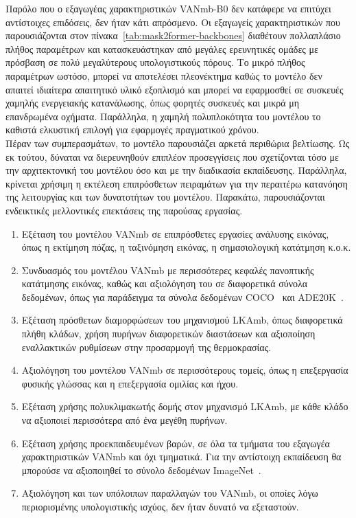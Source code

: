 \documentclass[12pt]{article}
\numberwithin{equation}{section}
\begin{document}
Παρόλο που ο εξαγωγέας χαρακτηριστικών VANmb-B0 δεν κατάφερε να επιτύχει αντίστοιχες επιδόσεις, δεν ήταν κάτι απρόσμενο. Οι εξαγωγείς χαρακτηριστικών που παρουσιάζονται στον πίνακα~\ref{tab:mask2former-backbones} διαθέτουν πολλαπλάσιο πλήθος παραμέτρων και κατασκευάστηκαν από μεγάλες ερευνητικές ομάδες με πρόσβαση σε πολύ μεγαλύτερους υπολογιστικούς πόρους. Το μικρό πλήθος παραμέτρων ωστόσο, μπορεί να αποτελέσει πλεονέκτημα καθώς το μοντέλο δεν απαιτεί ιδιαίτερα απαιτητικό υλικό εξοπλισμό και μπορεί να εφαρμοσθεί σε συσκευές χαμηλής ενεργειακής κατανάλωσης, όπως φορητές συσκευές και μικρά μη επανδρωμένα οχήματα. Παράλληλα, η χαμηλή πολυπλοκότητα του μοντέλου το καθιστά ελκυστική επιλογή για εφαρμογές πραγματικού χρόνου.\\

Πέραν των συμπερασμάτων, το μοντέλο παρουσιάζει αρκετά περιθώρια βελτίωσης. Ως εκ τούτου, δύναται να διερευνηθούν επιπλέον προσεγγίσεις που σχετίζονται τόσο με την αρχιτεκτονική του μοντέλου όσο και με την διαδικασία εκπαίδευσης. Παράλληλα, κρίνεται χρήσιμη η εκτέλεση επιπρόσθετων πειραμάτων για την περαιτέρω κατανόηση της λειτουργίας και των δυνατοτήτων του μοντέλου. Παρακάτω, παρουσιάζονται ενδεικτικές μελλοντικές επεκτάσεις της παρούσας εργασίας. \\

\begin{enumerate}
    \item Εξέταση του μοντέλου VANmb σε επιπρόσθετες εργασίες ανάλυσης εικόνας, όπως η εκτίμηση πόζας, η ταξινόμηση εικόνας, η σημασιολογική κατάτμηση κ.ο.κ.
    \item Συνδυασμός του μοντέλου VANmb με περισσότερες κεφαλές πανοπτικής κατάτμησης εικόνας, καθώς και αξιολόγηση του σε διαφορετικά σύνολα δεδομένων, όπως για παράδειγμα τα σύνολα δεδομένων COCO~\cite{lin2015microsoftcococommonobjects} και ADE20K~\cite{8100027}.
    \item Εξέταση πρόσθετων διαμορφώσεων του μηχανισμού LKAmb, όπως διαφορετικά πλήθη κλάδων, χρήση πυρήνων διαφορετικών διαστάσεων και αξιοποίηση εναλλακτικών ρυθμίσεων στην προσαρμογή της θερμοκρασίας.
    \item Αξιολόγηση του μοντέλου VANmb σε περισσότερους τομείς, όπως η επεξεργασία φυσικής γλώσσας και η επεξεργασία ομιλίας και ήχου.
    \item Εξέταση χρήσης πολυκλιμακωτής δομής στον μηχανισμό LKAmb, με κάθε κλάδο να αξιοποιεί περισσότερα από ένα μεγέθη πυρήνων.
    \item Εξέταση χρήσης προεκπαιδευμένων βαρών, σε όλα τα τμήματα του εξαγωγέα χαρακτηριστικών VANmb και όχι τμηματικά. Για την αντίστοιχη εκπαίδευση θα μπορούσε να αξιοποιηθεί το σύνολο δεδομένων ImageNet~\cite{5206848}.
    \item Αξιολόγηση και των υπόλοιπων παραλλαγών του VANmb, οι οποίες λόγω περιορισμένης υπολογιστικής ισχύος, δεν ήταν δυνατό να εξεταστούν.
\end{enumerate}
\end{document}
